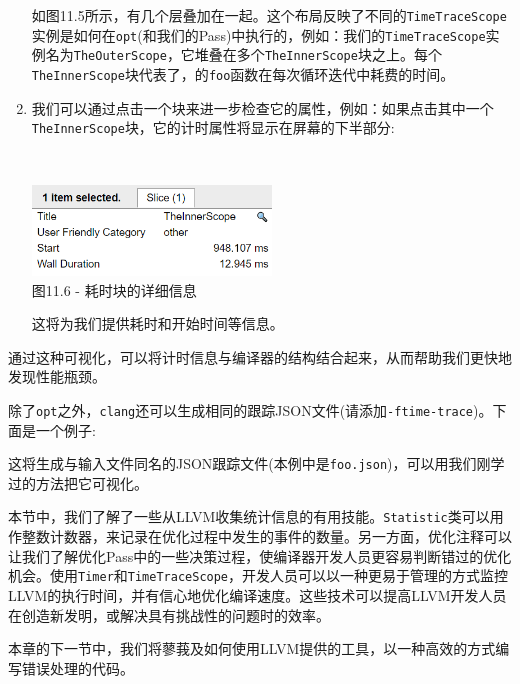 \begin{enumerate}
如图11.5所示，有几个层叠加在一起。这个布局反映了不同的\texttt{TimeTraceScope}实例是如何在\texttt{opt}(和我们的Pass)中执行的，例如：我们的\texttt{TimeTraceScope}实例名为\texttt{TheOuterScope}，它堆叠在多个\texttt{TheInnerScope}块之上。每个\texttt{TheInnerScope}块代表了，的\texttt{foo}函数在每次循环迭代中耗费的时间。

\item 我们可以通过点击一个块来进一步检查它的属性，例如：如果点击其中一个\texttt{TheInnerScope}块，它的计时属性将显示在屏幕的下半部分:

\hspace*{\fill} \\ %
\begin{center}
\includegraphics[width=0.5\textwidth]{content/3/chapter11/images/6.png}\\
图11.6 - 耗时块的详细信息
\end{center}

这将为我们提供耗时和开始时间等信息。

\end{enumerate}

通过这种可视化，可以将计时信息与编译器的结构结合起来，从而帮助我们更快地发现性能瓶颈。

除了\texttt{opt}之外，\texttt{clang}还可以生成相同的跟踪JSON文件(请添加\texttt{-ftime-trace})。下面是一个例子:


这将生成与输入文件同名的JSON跟踪文件(本例中是\texttt{foo.json})，可以用我们刚学过的方法把它可视化。

本节中，我们了解了一些从LLVM收集统计信息的有用技能。\texttt{Statistic}类可以用作整数计数器，来记录在优化过程中发生的事件的数量。另一方面，优化注释可以让我们了解优化Pass中的一些决策过程，使编译器开发人员更容易判断错过的优化机会。使用\texttt{Timer}和\texttt{TimeTraceScope}，开发人员可以以一种更易于管理的方式监控LLVM的执行时间，并有信心地优化编译速度。这些技术可以提高LLVM开发人员在创造新发明，或解决具有挑战性的问题时的效率。

本章的下一节中，我们将蓼莪及如何使用LLVM提供的工具，以一种高效的方式编写错误处理的代码。





